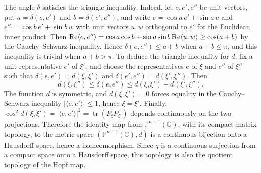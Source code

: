 The angle $\delta$ satisfies the triangle inequality. Indeed, let $e,e',e''$ be unit vectors, put $a=\delta(e,e')$ and $b=\delta(e',e'')$, and write $e=\cos a\,e'+\sin a\,u$ and $e''=\cos b\,e'+\sin b\,w$ with unit vectors $u,w$ orthogonal to $e'$ for the Euclidean inner product. Then $\operatorname{Re}\langle e,e''\rangle=\cos a\cos b+\sin a\sin b\operatorname{Re}\langle u,w\rangle\geq\cos(a+b)$ by the Cauchy--Schwarz inequality. Hence $\delta(e,e'')\leq a+b$ when $a+b\leq\pi$, and this inequality is trivial when $a+b>\pi$. To deduce the triangle inequality for $d$, fix a unit representative $e'$ of $\xi'$, and choose the representatives $e$ of $\xi$ and $e''$ of $\xi''$ such that $\delta(e,e')=d(\xi,\xi')$ and $\delta(e',e'')=d(\xi',\xi'')$. Then
\[
 d(\xi,\xi'')\leq\delta(e,e'')\leq d(\xi,\xi')+d(\xi',\xi'').
\]
The function $d$ is symmetric, and $d(\xi,\xi')=0$ forces equality in the Cauchy--Schwarz inequality $|\langle e,e'\rangle|\leq1$, hence $\xi=\xi'$. Finally, $\cos^2d(\xi,\xi')=|\langle e,e'\rangle|^2=\operatorname{tr}(P_\xi P_{\xi'})$ depends continuously on the two projections. Therefore the identity map from $\mathbb P^{n-1}(\mathbb C)$, with its compact matrix topology, to the metric space $(\mathbb P^{n-1}(\mathbb C),d)$ is a continuous bijection onto a Hausdorff space, hence a homeomorphism. Since $q$ is a continuous surjection from a compact space onto a Hausdorff space, this topology is also the quotient topology of the Hopf map.

